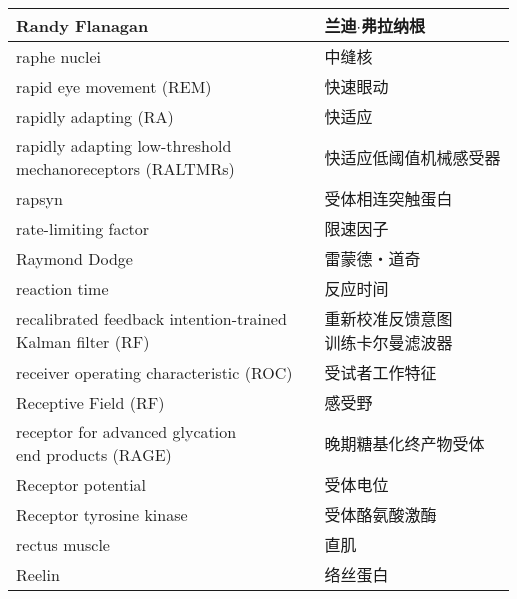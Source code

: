 \begin{longtable}{lll}
	\midrule
	Randy Flanagan   && 兰迪$\cdot$弗拉纳根  \\
	
	\midrule
	raphe nuclei   && 中缝核  \\
	
	\midrule
	rapid eye movement (REM)   && 快速眼动  \\
	
	\midrule
	rapidly adapting (RA)   && 快适应  \\
	
	\midrule
	\makecell[l]{rapidly adapting low-threshold\\ mechanoreceptors (RALTMRs)}  && 快适应低阈值机械感受器  \\
	
	\midrule
	rapsyn  && 受体相连突触蛋白  \\
	
	\midrule
	rate-limiting factor  && 限速因子  \\
	
	\midrule
	Raymond Dodge  && 雷蒙德・道奇  \\
	
	\midrule
	reaction time  && 反应时间  \\
	
	\midrule
	\makecell[l]{recalibrated feedback intention-trained\\ Kalman filter (RF)}   && \makecell[l]{重新校准反馈意图\\训练卡尔曼滤波器}  \\
	
	\midrule
	receiver operating characteristic (ROC)   && 受试者工作特征  \\
	
	\midrule
	Receptive Field (RF)   && 感受野  \\
	
	\midrule
	\makecell[l]{receptor for advanced glycation \\end products (RAGE)}   && 晚期糖基化终产物受体  \\
	
	\midrule
	Receptor potential   && 受体电位  \\
	
	\midrule
	Receptor tyrosine kinase   && 受体酪氨酸激酶  \\
	
	\midrule
	rectus muscle   && 直肌  \\
	
	\midrule
	Reelin   && 络丝蛋白  \\
	

\end{longtable}
